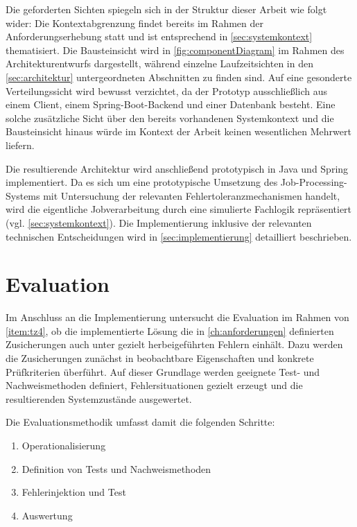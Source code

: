 Die geforderten Sichten spiegeln sich in der Struktur dieser Arbeit wie folgt wider:
Die Kontextabgrenzung findet bereits im Rahmen der Anforderungserhebung statt und ist entsprechend in \cref{sec:systemkontext} thematisiert.
Die Bausteinsicht wird in \cref{fig:componentDiagram} im Rahmen des Architekturentwurfs dargestellt, während einzelne
Laufzeitsichten in den \cref{sec:architektur} untergeordneten Abschnitten zu finden sind.
Auf eine gesonderte Verteilungssicht wird bewusst verzichtet, da der Prototyp ausschließlich aus einem Client, einem Spring-Boot-Backend
und einer Datenbank besteht.
Eine solche zusätzliche Sicht über den bereits vorhandenen Systemkontext und die Bausteinsicht hinaus würde im Kontext der
Arbeit keinen wesentlichen Mehrwert liefern.

Die resultierende Architektur wird anschließend prototypisch in Java und Spring implementiert.
Da es sich um eine prototypische Umsetzung des Job-Processing-Systems mit Untersuchung der relevanten Fehlertoleranzmechanismen handelt,
wird die eigentliche Jobverarbeitung durch eine simulierte Fachlogik repräsentiert (vgl. \cref{sec:systemkontext}).
Die Implementierung inklusive der relevanten technischen Entscheidungen wird in \cref{sec:implementierung} detailliert beschrieben.

\section{Evaluation}
\label{sec:evaluationsmethodik}
Im Anschluss an die Implementierung untersucht die Evaluation im Rahmen von \ref{item:tz4}, ob die implementierte Lösung
die in \cref{ch:anforderungen} definierten Zusicherungen auch unter gezielt herbeigeführten Fehlern einhält.
Dazu werden die Zusicherungen zunächst in beobachtbare Eigenschaften und konkrete Prüfkriterien überführt.
Auf dieser Grundlage werden geeignete Test- und Nachweismethoden definiert, Fehlersituationen gezielt erzeugt und die
resultierenden Systemzustände ausgewertet.

Die Evaluationsmethodik umfasst damit die folgenden Schritte:
\begin{enumerate}
    \item{Operationalisierung}
    \item{Definition von Tests und Nachweismethoden}
    \item{Fehlerinjektion und Test}
    \item{Auswertung}
\end{enumerate}

